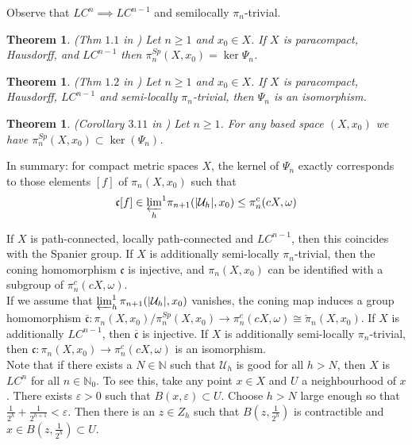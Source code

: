 \documentclass[a4paper,11pt]{article}
\theoremstyle{definition}
\theoremstyle{plain}
\newtheorem{theorem}[definition]{Theorem}
\theoremstyle{remark}
\begin{document}
{Observe that $LC^n\implies LC^{n-1}$ and semilocally $\pi_n$-trivial. 


\begin{theorem} \label{kernelspanier} (Thm $1.1$ in \cite{aceti2023elements}) Let $n\geq 1$ and $x_0\in X$. If $X$ is paracompact, Hausdorff, and $LC^{n-1}$ then $\pi_{n}^{Sp}(X,x_0)=\ker{\Psi_n}$. 
\end{theorem}

\begin{theorem} \label{coningiso} (Thm $1.2$ in \cite{aceti2023elements}) Let $n\geq 1$ and $x_0\in X$. If $X$ is paracompact, Hausdorff, $LC^{n-1}$ and semi-locally $\pi_n$-trivial, then $\Psi_n$ is an isomorphism.
\end{theorem}

\begin{theorem} (Corollary $3.11$ in  \cite{aceti2023elements}) Let $n\geq 1$. For any based space $(X,x_0)$ we have $\pi_{n}^{Sp}(X,x_0) \subset \ker (\Psi_{n})$. 
\end{theorem}

In summary: for compact metric spaces $X$, the kernel of $\Psi_{n}$ exactly corresponds to those elements $[f]$ of $\pi_{n}(X,x_0)$ such that 
\begin{align*}
\mathfrak{c} [f] \in  {\varprojlim_h}^1 \pi_{n+1}(|\mathcal{U}_{h}|,x_0) \leq \pi_{n}^{c}(cX,\omega)
\end{align*}

If $X$ is path-connected, locally path-connected and $LC^{n-1}$, then this coincides with the Spanier group. If $X$ is additionally semi-locally $\pi_{n}$-trivial, then the coning homomorphism $\mathfrak{c}$ is injective, and  $ \pi_{n}(X,x_0)$ can be identified with a subgroup of $\pi_{n}^{c}(cX,\omega)$. \\

If we assume that $\varprojlim_h^1 \pi_{n+1}(|\mathcal{U}_{h}|,x_0)$ vanishes, the coning map induces a group homomorphism $\overline{\mathfrak{c}}: \pi_{n}(X,x_0)/\pi_{n}^{Sp}(X,x_0) \rightarrow \pi_{n}^{c}(cX,\omega)\cong \check{\pi}_{n}(X,x_0)$. If $X$ is additionally $LC^{n-1}$, then $\overline{\mathfrak{c}}$ is injective. If $X$ is additionally semi-locally $\pi_{n}$-trivial, then $\mathfrak{c}:\pi_{n}(X,x_0) \rightarrow \pi_{n}^{c}(cX,\omega)$ is an isomorphism. \\

Note that if there exists a $N\in \mathbb{N}$ such that $\mathcal{U}_{h}$ is good for all $h>N$, then $X$ is $LC^{n}$ for all $n\in \mathbb{N}_{0}$. To see this, take any point $x\in X$ and $U$ a neighbourhood of $x$. There exists $\varepsilon>0$ such that $B(x,\varepsilon)\subset U$. Choose $h>N$ large enough so that $\frac{1}{2^h}+\frac{1}{2^{h+1}}<\varepsilon$. Then there is an $z\in Z_{h}$ such that $ B(z,\frac{1}{2^h})$ is contractible and $x\in B(z,\frac{1}{2^h})\subset U$. \\

}
\end{document}

